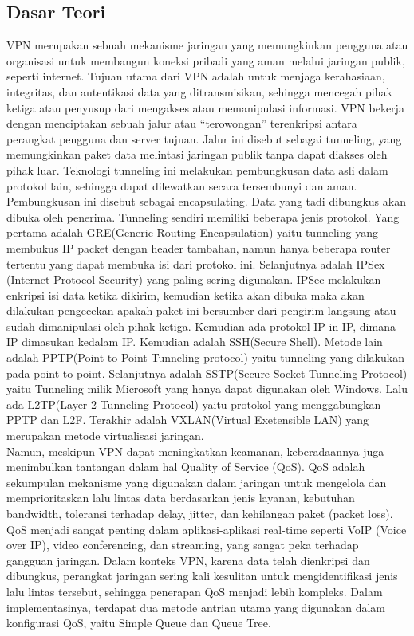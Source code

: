 \subsection{Dasar Teori}
VPN merupakan sebuah mekanisme jaringan yang memungkinkan pengguna atau organisasi untuk membangun koneksi pribadi yang aman melalui jaringan publik, seperti internet. Tujuan utama dari VPN adalah untuk menjaga kerahasiaan, integritas, dan autentikasi data yang ditransmisikan, sehingga mencegah pihak ketiga atau penyusup dari mengakses atau memanipulasi informasi. VPN bekerja dengan menciptakan sebuah jalur atau “terowongan” terenkripsi antara perangkat pengguna dan server tujuan. Jalur ini disebut sebagai tunneling, yang memungkinkan paket data melintasi jaringan publik tanpa dapat diakses oleh pihak luar. Teknologi tunneling ini melakukan pembungkusan data asli dalam protokol lain, sehingga dapat dilewatkan secara tersembunyi dan aman. Pembungkusan ini disebut sebagai encapsulating. Data yang tadi dibungkus akan dibuka oleh penerima. Tunneling sendiri memiliki beberapa jenis protokol. Yang pertama adalah GRE(Generic Routing Encapsulation) yaitu tunneling yang membukus IP packet dengan header tambahan, namun hanya beberapa router tertentu yang dapat membuka isi dari protokol ini. Selanjutnya adalah IPSex (Internet Protocol Security) yang paling sering digunakan. IPSec melakukan enkripsi isi data ketika dikirim, kemudian ketika akan dibuka maka akan dilakukan pengecekan apakah paket ini bersumber dari pengirim langsung atau sudah dimanipulasi oleh pihak ketiga. Kemudian ada protokol IP-in-IP, dimana IP dimasukan kedalam IP. Kemudian adalah SSH(Secure Shell). Metode lain adalah PPTP(Point-to-Point Tunneling protocol) yaitu tunneling yang dilakukan pada point-to-point. Selanjutnya adalah SSTP(Secure Socket Tunneling Protocol) yaitu Tunneling milik Microsoft yang hanya dapat digunakan oleh Windows. Lalu ada L2TP(Layer 2 Tunneling Protocol) yaitu protokol yang menggabungkan PPTP dan L2F. Terakhir adalah VXLAN(Virtual Exetensible LAN) yang merupakan metode virtualisasi jaringan.\\
Namun, meskipun VPN dapat meningkatkan keamanan, keberadaannya juga menimbulkan tantangan dalam hal Quality of Service (QoS). QoS adalah sekumpulan mekanisme yang digunakan dalam jaringan untuk mengelola dan memprioritaskan lalu lintas data berdasarkan jenis layanan, kebutuhan bandwidth, toleransi terhadap delay, jitter, dan kehilangan paket (packet loss). QoS menjadi sangat penting dalam aplikasi-aplikasi real-time seperti VoIP (Voice over IP), video conferencing, dan streaming, yang sangat peka terhadap gangguan jaringan. Dalam konteks VPN, karena data telah dienkripsi dan dibungkus, perangkat jaringan sering kali kesulitan untuk mengidentifikasi jenis lalu lintas tersebut, sehingga penerapan QoS menjadi lebih kompleks.  Dalam implementasinya, terdapat dua metode antrian utama yang digunakan dalam konfigurasi QoS, yaitu Simple Queue dan Queue Tree.\\
